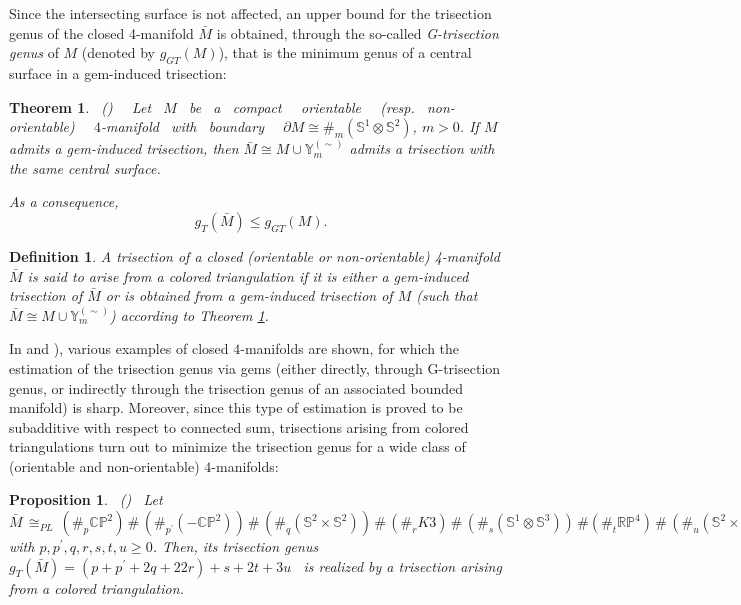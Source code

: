 \documentclass[12pt,a4paper]{article}
\newtheorem{theorem}[lemma]{Theorem}
\newtheorem{proposition}[lemma]{Proposition}
\newtheorem{definition}{Definition}
\begin{document}
Since the intersecting surface is not affected,  an upper bound for the trisection genus of the closed 4-manifold $\bar M$ is obtained, through the so-called \emph{G-trisection genus} of $M$ (denoted by $g_{GT} (M)$), that is the minimum genus of a central surface in a gem-induced trisection: 

\begin{theorem}\label{trisection_from_gem-induced} \ {\rm (\cite{Casali-Cristofori trisection bis})} \ 
\ Let \ $M$ \ be \ a \ compact \ \ orientable \ \ (resp. \ non-orientable) \ \ $4$-manifold \ with \ boundary  \  \  $\partial M \cong \#_m(\mathbb S^1 \otimes \mathbb S^2)$, $m>0$.           
If $M$ admits a gem-induced trisection,  then $\bar M \cong M \cup {\mathbb Y}_m^{(\sim)}\!$   admits a trisection with the same central surface.  

As a consequence, $$g_T(\bar M) \le g_{GT} (M).$$
\end{theorem}


\medskip 

\begin{definition}
{\em A trisection of a closed (orientable or non-orientable) 4-manifold $\bar M$ is said to {\it arise from a colored triangulation} if it is either a gem-induced trisection of $\bar M$ or is obtained from a gem-induced trisection of $M$ (such that $\bar M \cong M \cup {\mathbb Y}_m^{(\sim)}$) according to Theorem \ref{trisection_from_gem-induced}.   }  
\end{definition} 

\bigskip


In \cite{Casali-Cristofori gem-induced} and \cite{Casali-Cristofori trisection bis}), various examples of closed $4$-manifolds are shown, for which the estimation of the trisection genus via gems (either directly, through G-trisection genus, or indirectly through the trisection genus of an associated bounded manifold) is sharp. 
Moreover, since this type of estimation is proved to be subadditive with respect to connected sum,  
trisections arising from colored triangulations turn out to minimize the trisection genus for a wide class of (orientable and non-orientable) $4$-manifolds: 
 
\begin{proposition} \label{calculations} \ {\rm (\cite{Casali-Cristofori trisection bis})} \  Let \ 
$\bar M\, \cong_{PL}\,(\#_p\mathbb {CP}^2)\,\#\,(\#_{p^{\prime}}(-\mathbb {CP}^2))\, \#\, (\#_q(\mathbb S^2\times \mathbb S^2)) \, \#  \, (\#_r K3) \,\#\,(\#_s(\mathbb S^1 \otimes \mathbb S^3))\, \# (\#_t\mathbb R \mathbb P^4)\,\# \, (\#_u  (\mathbb S^2 \times \mathbb {RP}^2 )),$  with $p,p^{\prime},q, r,s,t,u \geq 0$.  
Then, its trisection genus \ $ g_T(\bar M)  = (p + p^{\prime} + 2q + 22r)+s+2t+3u$ \ 
is realized by a trisection arising from a colored triangulation.
\end{proposition}  
\end{document}
